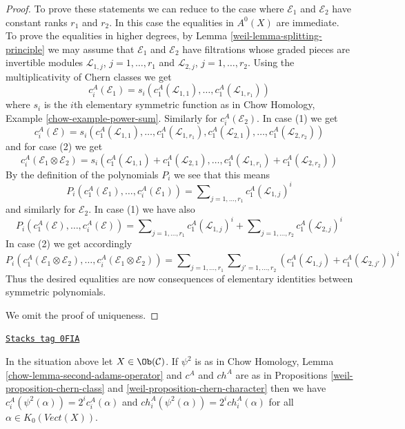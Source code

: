 \begin{proof}
\medskip\noindent
To prove these statements we can reduce to the case where $\mathcal{E}_1$
and $\mathcal{E}_2$ have constant ranks $r_1$ and $r_2$. In this case the
equalities in $A^0(X)$ are immediate. To prove the equalities in higher
degrees, by Lemma \ref{weil-lemma-splitting-principle} we may
assume that $\mathcal{E}_1$ and $\mathcal{E}_2$ have filtrations
whose graded pieces are invertible modules
$\mathcal{L}_{1, j}$, $j = 1, \ldots, r_1$ and
$\mathcal{L}_{2, j}$, $j = 1, \ldots, r_2$.
Using the multiplicativity of Chern classes we get
$$
c_i^A(\mathcal{E}_1) =
s_i(c_1^A(\mathcal{L}_{1, 1}), \ldots, c_1^A(\mathcal{L}_{1, r_1}))
$$
where $s_i$ is the $i$th elementary symmetric function as in
Chow Homology, Example \ref{chow-example-power-sum}.
Similarly for $c_i^A(\mathcal{E}_2)$. In case (1) we get
$$
c_i^A(\mathcal{E}) =
s_i(c_1^A(\mathcal{L}_{1, 1}), \ldots, c_1^A(\mathcal{L}_{1, r_1}),
c_1^A(\mathcal{L}_{2, 1}), \ldots, c_1^A(\mathcal{L}_{2, r_2}))
$$
and for case (2) we get
$$
c_i^A(\mathcal{E}_1 \otimes \mathcal{E}_2) =
s_i(c_1^A(\mathcal{L}_{1, 1}) + c_1^A(\mathcal{L}_{2, 1}),
\ldots, c_1^A(\mathcal{L}_{1, r_1}) + c_1^A(\mathcal{L}_{2, r_2}))
$$
By the definition of the polynomials $P_i$ we see that this means
$$
P_i(c^A_1(\mathcal{E}_1), \ldots, c^A_i(\mathcal{E}_1)) =
\sum\nolimits_{j = 1, \ldots, r_1} c_1^A(\mathcal{L}_{1, j})^i
$$
and similarly for $\mathcal{E}_2$. In case (1) we have also
$$
P_i(c^A_1(\mathcal{E}), \ldots, c^A_i(\mathcal{E})) =
\sum\nolimits_{j = 1, \ldots, r_1} c_1^A(\mathcal{L}_{1, j})^i +
\sum\nolimits_{j = 1, \ldots, r_2} c_1^A(\mathcal{L}_{2, j})^i
$$
In case (2) we get accordingly
$$
P_i(c^A_1(\mathcal{E}_1 \otimes \mathcal{E}_2), \ldots,
c^A_i(\mathcal{E}_1 \otimes \mathcal{E}_2)) =
\sum\nolimits_{j = 1, \ldots, r_1}
\sum\nolimits_{j' = 1, \ldots, r_2}
(c_1^A(\mathcal{L}_{1, j}) + c_1^A(\mathcal{L}_{2, j'}))^i
$$
Thus the desired equalities are now consequences of elementary
identities between symmetric polynomials.

\medskip\noindent
We omit the proof of uniqueness.
\end{proof}

\begin{lemma}
\label{weil-lemma-adams-and-chern}
\href{https://stacks.math.columbia.edu/tag/0FIA}{\texttt{Stacks tag 0FIA}}

In the situation above let $X \in \Ob(\mathcal{C})$.
If $\psi^2$ is as in
Chow Homology, Lemma \ref{chow-lemma-second-adams-operator}
and $c^A$ and $ch^A$ are as in
Propositions \ref{weil-proposition-chern-class} and
\ref{weil-proposition-chern-character}
then we have $c^A_i(\psi^2(\alpha)) = 2^i c^A_i(\alpha)$ and
$ch^A_i(\psi^2(\alpha)) = 2^i ch^A_i(\alpha)$
for all $\alpha \in K_0(\textit{Vect}(X))$.
\end{lemma}


